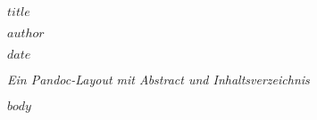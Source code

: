 \documentclass[12pt,a4paper]{article}
\begin{document}
\begin{titlepage}
  \centering
  {\Huge \bfseries $title$ \par}
  \vspace{1cm}
  {\Large $author$ \par}
  \vspace{1cm}
  {\large $date$ \par}
  \vfill
  {\itshape Ein Pandoc-Layout mit Abstract und Inhaltsverzeichnis}
  \vspace{1cm}
\end{titlepage}

\newpage
\begin{abstract}
$abstract$
\end{abstract}

\newpage
\tableofcontents
\newpage

$body$
\end{document}
